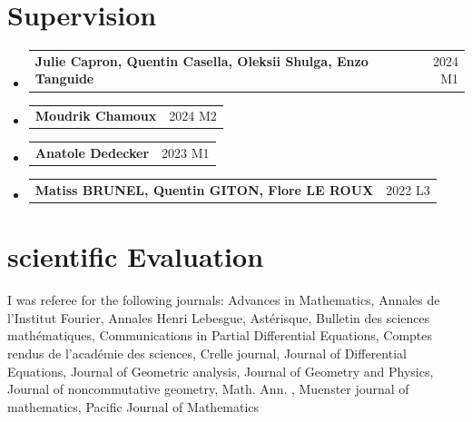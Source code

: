 \documentclass[A4,11pt]{article}
\makeatletter
\newcommand{\CVSubheading}[4]{
  \vspace{-2pt}\item
    \begin{tabular*}{0.97\textwidth}[t]{l@{\extracolsep{\fill}}r}
      \textbf{#1} & #2 \\
      \small#3 & \small #4 \\
    \end{tabular*}\vspace{-7pt}
}
\newcommand{\CVSubheadingshort}[2]{
  \vspace{-2pt}\item
    \begin{tabular*}{0.97\textwidth}[t]{l@{\extracolsep{\fill}}r}
      \textbf{#1} & #2 \\
    \end{tabular*}\vspace{-7pt}
}
\newcommand{\CVSubHeadingListStart}{\begin{itemize}[leftmargin=0.5cm, label={}]}
\newcommand{\CVSubHeadingListEnd}{\end{itemize}}
\makeatother
\begin{document}
  \section{Supervision}
  \CVSubHeadingListStart
\CVSubheadingshort
{Julie Capron, Quentin Casella, Oleksii Shulga, Enzo Tanguide}{2024 M1}
\CVSubheadingshort
{Moudrik Chamoux}{2024 M2}
    \CVSubheadingshort
      {Anatole Dedecker}{2023 M1}
      \CVSubheadingshort
      {Matiss BRUNEL, Quentin GITON, Flore LE ROUX}{2022 L3}

  \CVSubHeadingListEnd
  \section{scientific Evaluation}
  I was referee for the following journals: Advances in Mathematics, Annales de l'Institut Fourier, Annales Henri Lebesgue, Astérisque, Bulletin des sciences mathématiques, Communications in Partial Differential Equations, Comptes rendus de l'académie des sciences, Crelle journal, Journal of Differential Equations, Journal of Geometric analysis, Journal of Geometry and Physics, Journal of noncommutative geometry, Math. Ann.  , Muenster journal of mathematics, Pacific Journal of Mathematics
\iffalse
\end{document}
